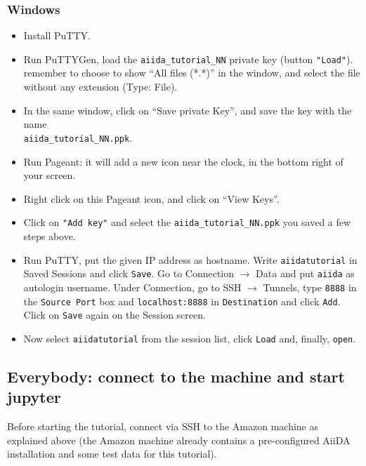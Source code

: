 \subsubsection*{Windows}
\begin{itemize}
\item Install PuTTY.
\item Run PuTTYGen, load the \verb|aiida_tutorial_NN| private key
  (button \verb|"Load"|). remember to choose to show ``All files
  (*.*)'' in the window, and select the file without any extension
  (Type: File).
\item In the same window, click on ``Save private Key'', and save the
  key with the name\\ \verb|aiida_tutorial_NN.ppk|.
\item Run Pageant: it will add a new icon near the clock, in the
  bottom right of your screen.
\item Right click on this Pageant icon, and click on ``View Keys''.
\item Click on \verb|"Add key"| and select the
  \verb|aiida_tutorial_NN.ppk| you saved a few steps above.
\item Run PuTTY, put the given IP address as hostname. Write \verb|aiidatutorial| in Saved Sessions and click \verb|Save|. Go to Connection $\to$ Data and put \verb|aiida| as autologin username. Under Connection, go to SSH $\to$ Tunnels, type \texttt{8888} in the \texttt{Source Port} box and \texttt{localhost:8888} in \texttt{Destination} and click \verb|Add|.  Click on \verb|Save| again on the Session screen.

\item Now select \verb|aiidatutorial| from the session list, click \verb|Load| and, finally, \verb|open|.

\end{itemize}

\subsection*{Everybody: connect to the machine and start jupyter}

Before starting the tutorial, connect via SSH to the Amazon machine as explained above (the Amazon machine already contains a pre-configured AiiDA installation and some test data for this tutorial).
